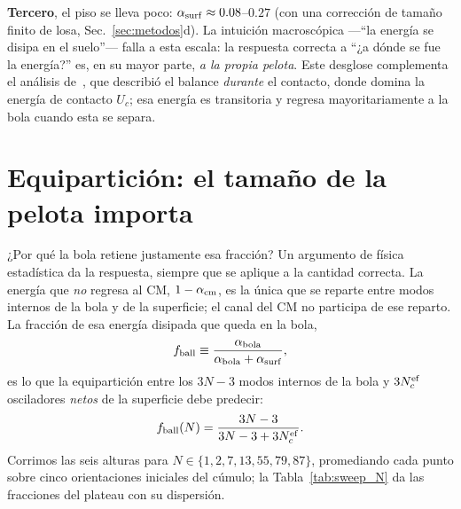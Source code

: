 \documentclass[10pt,a4paper,twocolumn]{article}
\begin{document}
\textbf{Tercero}, el piso se lleva poco:
$\alpha_{\rm surf}\approx0.08$--$0.27$ (con una corrección de tamaño finito
de losa, Sec.~\ref{sec:metodos}d). La intuición macroscópica ---``la
energía se disipa en el suelo''--- falla a esta escala: la respuesta
correcta a ``¿a dónde se fue la energía?'' es, en su mayor parte,
\emph{a la propia pelota}. Este desglose complementa el análisis
de~\cite{Gutierrez2012}, que describió el balance \emph{durante} el
contacto, donde domina la energía de contacto $U_c$; esa energía es
transitoria y regresa mayoritariamente a la bola cuando esta se separa.

\section{Equipartición: el tamaño de la pelota importa}
\label{sec:equiparticion}

¿Por qué la bola retiene justamente esa fracción? Un argumento de física
estadística da la respuesta, siempre que se aplique a la cantidad correcta.
La energía que \emph{no} regresa al CM, $1-\alpha_{\rm cm}$, es la única que se
reparte entre modos internos de la bola y de la superficie; el canal del CM no
participa de ese reparto. La fracción de esa energía disipada que queda en la
bola,
\begin{equation}
    f_{\rm ball} \equiv
    \frac{\alpha_{\rm bola}}{\alpha_{\rm bola}+\alpha_{\rm surf}},
    \label{eq:fball}
\end{equation}
es lo que la equipartición entre los $3N-3$ modos internos de la bola y
$3N_c^{\rm ef}$ osciladores \emph{netos} de la superficie debe predecir:
\begin{equation}
    f_{\rm ball}(N) = \frac{3N-3}{3N-3+3N_c^{\rm ef}}.
    \label{eq:equiparticion}
\end{equation}
Corrimos las seis alturas para $N\in\{1,2,7,13,55,79,87\}$, promediando cada
punto sobre cinco orientaciones iniciales del cúmulo; la
Tabla~\ref{tab:sweep_N} da las fracciones del plateau con su dispersión.
\end{document}
